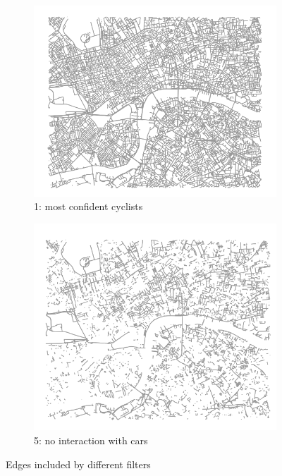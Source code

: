\documentclass[11pt]{article} %
\begin{document}
\begin{figure}
\centering
\begin{subfigure}{.5\textwidth}
  \centering
  \includegraphics[width=1\linewidth]{bbox_bike_1_filter_cropped}
  \caption{1: most confident cyclists}
  \label{fig:sub1}
\end{subfigure}%
\begin{subfigure}{.5\textwidth}
  \centering
  \includegraphics[width=1\linewidth]{bbox_bike_5_filter_cropped}
  \caption{5: no interaction with cars }
  \label{fig:sub2}
\end{subfigure}
\caption{Edges included by different filters}
\label{fig:test}
\end{figure}
\end{document}
